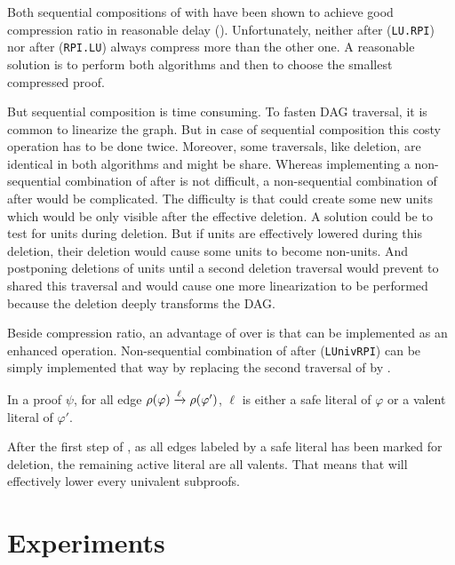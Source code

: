 \documentclass{llncs}
\begin{document}
Both sequential compositions of {\LowerUnits} with {\RPI} have been shown to achieve good
compression ratio in reasonable delay (\cite{LURPI}). Unfortunately, neither {\LowerUnits} after
{\RPI} (\texttt{LU.RPI}) nor {\RPI} after {\LowerUnits} (\texttt{RPI.LU}) always compress more than
the other one. A reasonable solution is to perform both algorithms and then to choose the smallest
compressed proof.

But sequential composition is time consuming. To fasten DAG traversal, it is common to linearize the
graph. But in case of sequential composition this costy operation has to be done twice. Moreover,
some traversals, like deletion, are identical in both algorithms and might be share. Whereas
implementing a non-sequential combination of {\RPI} after {\LowerUnits} is not difficult, a
non-sequential combination of {\LowerUnits} after {\RPI} would be complicated. The difficulty
is that {\RPI} could create some new units which would be only visible after the effective deletion.
A solution could be to test for units during deletion. But if units are effectively lowered during
this deletion, their deletion would cause some units to become non-units. And postponing deletions of
units until a second deletion traversal would prevent to shared this traversal and would cause one more
linearization to be performed because the deletion deeply transforms the DAG.

Beside compression ratio, an advantage of {\LowerUnivalents} over {\LowerUnits} is that
{\LowerUnivalents} can be implemented as an enhanced  operation.  Non-sequential
combination of {\LowerUnivalents} after {\RPI} (\texttt{LUnivRPI}) can be simply implemented that way by
replacing the second traversal of {\RPI} by {\LowerUnivalents}.

\begin{proposition} \label{prop:LunivRPI}
In a proof $\psi$, for all edge $\rho(\varphi) \xrightarrow{\ell} \rho(\varphi')$, $\ell$ is
either a safe literal of $\varphi$ or a valent literal of $\varphi'$.
\end{proposition}

After the first step of {\RPI}, as all edges labeled by a safe literal has been marked for deletion,
the remaining active literal are all valents. That means that {\LowerUnivalents} will effectively
lower every univalent subproofs.



\section{Experiments} \label{sec:exp}
\end{document}
